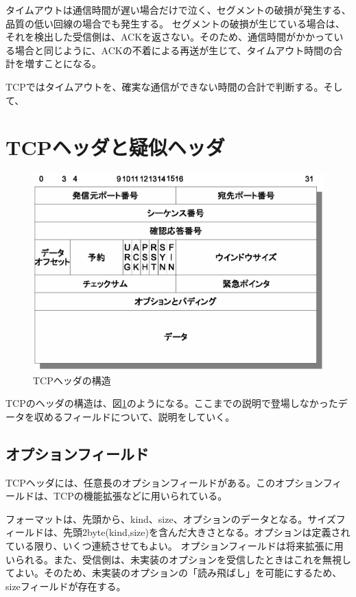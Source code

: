 タイムアウトは通信時間が遅い場合だけで泣く、セグメントの破損が発生する、品質の低い回線の場合でも発生する。
セグメントの破損が生じている場合は、それを検出した受信側は、ACKを返さない。そのため、通信時間がかかっている場合と同じように、ACKの不着による再送が生じて、タイムアウト時間の合計を増すことになる。

TCPではタイムアウトを、確実な通信ができない時間の合計で判断する。そして、

\section{TCPヘッダと疑似ヘッダ}

\begin{figure}[htbp]
	\includegraphics[width=12cm,clip]{draw/tcpheader.eps}
	\caption{TCPヘッダの構造}
	\label{fig:tcpheader}
\end{figure}

TCPのヘッダの構造は、図\ref{fig:tcpheader}のようになる。ここまでの説明で登場しなかったデータを収めるフィールドについて、説明をしていく。

\subsection{オプションフィールド}
TCPヘッダには、任意長のオプションフィールドがある。このオプションフィールドは、TCPの機能拡張などに用いられている。

フォーマットは、先頭から、kind、size、オプションのデータとなる。サイズフィールドは、先頭2byte(kind,size)を含んだ大きさとなる。オプションは定義されている限り、いくつ連続させてもよい。
オプションフィールドは将来拡張に用いられる。また、受信側は、未実装のオプションを受信したときはこれを無視してよい。そのため、未実装のオプションの「読み飛ばし」を可能にするため、sizeフィールドが存在する。

